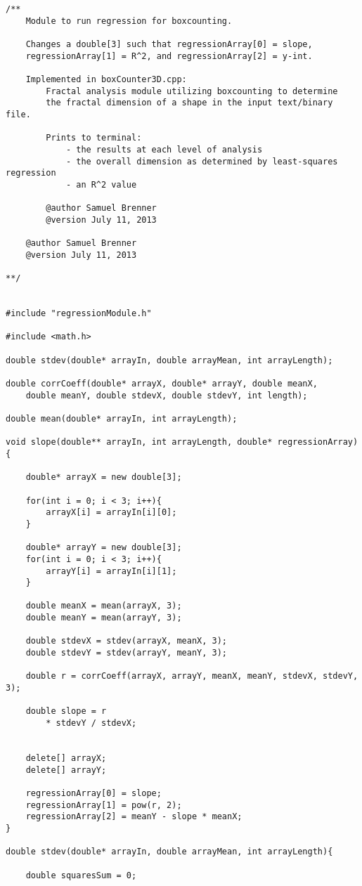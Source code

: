 \begin{lstlisting}
/**
	Module to run regression for boxcounting.
	
	Changes a double[3] such that regressionArray[0] = slope,
	regressionArray[1] = R^2, and regressionArray[2] = y-int.

	Implemented in boxCounter3D.cpp:
		Fractal analysis module utilizing boxcounting to determine 
		the fractal dimension of a shape in the input text/binary file.

		Prints to terminal:
			- the results at each level of analysis
			- the overall dimension as determined by least-squares regression
			- an R^2 value
			
		@author Samuel Brenner
		@version July 11, 2013

	@author Samuel Brenner
	@version July 11, 2013

**/


#include "regressionModule.h"

#include <math.h>

double stdev(double* arrayIn, double arrayMean, int arrayLength);

double corrCoeff(double* arrayX, double* arrayY, double meanX, 
	double meanY, double stdevX, double stdevY, int length);

double mean(double* arrayIn, int arrayLength);

void slope(double** arrayIn, int arrayLength, double* regressionArray){
	
	double* arrayX = new double[3];

	for(int i = 0; i < 3; i++){
		arrayX[i] = arrayIn[i][0];
	}

	double* arrayY = new double[3];
	for(int i = 0; i < 3; i++){
		arrayY[i] = arrayIn[i][1];
	}

	double meanX = mean(arrayX, 3);
	double meanY = mean(arrayY, 3);

	double stdevX = stdev(arrayX, meanX, 3);
	double stdevY = stdev(arrayY, meanY, 3);

	double r = corrCoeff(arrayX, arrayY, meanX, meanY, stdevX, stdevY, 3);

	double slope = r 
		* stdevY / stdevX;


	delete[] arrayX;
 	delete[] arrayY;

 	regressionArray[0] = slope;
 	regressionArray[1] = pow(r, 2);
 	regressionArray[2] = meanY - slope * meanX;
}

double stdev(double* arrayIn, double arrayMean, int arrayLength){

	double squaresSum = 0;


\end{lstlisting}
